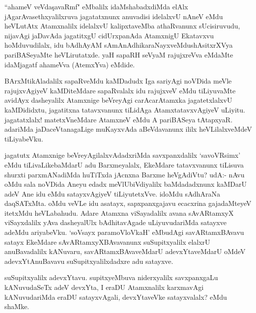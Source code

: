 \begin{artha}%
``ahameV veVda\c savaRmf" eMbalilx idaMshabadxdiMda elAlx jAgarAvasethxyalilxruva jagatatxnunx anuvadisi idelalxvU nAneV eMdu heVLutAtx Atamxnalilx idelalxvU kalipxtaveMba athaRvanunx sUcisiruvudu, nijavAgi jaDavAda jagatitxgU cidUrxpanAda AtamxnigU Ekatavxvu hoMduvudilalx, idu bAdhAyAM sAmAnAdhikaraNayxveMdu\break shAsitxrXVya pariBASeyaMte heVLirutatxde. yaH sapaRH seVyaM rajujxreVva eMdaMte idaMjagatf ahameVva (AtemxYva) eMdide.
\end{artha}

\begin{artha}
BArxMtikAladalilx sapaRveMdu kaMDadudx Iga sariyAgi noVDida meVle rajujxvAgiyeV kaMDiteMdare sapaRvalalx idu rajujxveV eMdu tiLiyuvaMte avidAyx dasheyalilx Atamxnige beVreyAgi carAcarAtamxka jagatetxlalxvU kaMDididxtu, jagatitxna tatavxvanunx tiLidAga AtamxtatavxvAgiyeV uLiyitu. jagatatxlalx! matetxVneMdare AtamxneV eMdu A pariBASeya tAtapxyaR. adariMda jaDaceVtanagaLige muKayxvAda aBeVdavanunx ililx heVLilalxveMdeV tiLiyabeVku. 
\end{artha}

\begin{artha}
jagatutx Atamxnige beVreyAgilalxvAdadxriMda savxpanxdalilx `savoVR\s simx' eMdu tiLivaLikebaMdarU adu Barxmeyalalx, EkeMdare tatavxvanunx tiLisuva shurxti parxmANadiMda huTiTxda jAcnxna Barxme heVgAdiVtu? udA:- nAvu oMdu sala noVDida Aneyu edadx meVlU\break biVdiyalilx baMdadadxnunx kaMDarU adeV Ane idu eMdu satayxvAgiyeV tiLiyutetxVve. idoMdu sAdhAraNa daqSATxMta. oMdu veVLe idu asatayx, sapxpanxgajavu ecacxrina gajadaMteyeV itetxMdu heVLabahudu. Adare Atamxna viSayadalilx avana sAvARtamxyX viSayxdalilx yAva dasheyalUlx bAdhitavAgade uLiyuvudariMda satayxve adeMdu ariyabeVku. `soV\s sayx paramoVloVkaH' eMbudAgi savARtamx\break BAvavu satayx EkeMdare sAvARtamxyXBAvavanunx suSupitxyalilx elalxrU anuBavadalilx kANuvaru, savARtamxBAvaveMdarU adevxYtaveMdarU oMdeV adevxYtAnuBavavu suSupitxyalilxdadxre adu satayxve. 
\end{artha}


\begin{artha}
suSupitxyalilx adevxYtavu. supitxyeMbuva niderxyalilx savxpanxgaLu kANuvudaSeTx adeV devxYta, I eraDU Atamxnalilx karxmavAgi kANuvudariMda eraDU satayxvAgali, devxYtaveVke satayxvalalx? eMdu shaMke. 
\end{artha}

